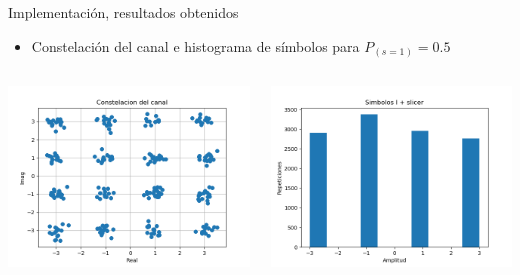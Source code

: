 \documentclass[xcolor=table]{beamer}
\begin{document}
\begin{frame}{Implementación, resultados obtenidos}
     \begin{itemize}
        \item Constelación del canal e histograma de símbolos para $P_{(s=1)}=0.5$
    \end{itemize}
\begin{columns}
    \begin{column}{0.48\paperwidth}
    \includegraphics[width=\textwidth]{Graficos/Channel_Constelation_2.png}%
    \end{column}
    \begin{column}{0.48\paperwidth}  
    \includegraphics[width=\textwidth]{Graficos/I_symbols_slicer_2.png}
    \end{column}
\end{columns}
\end{frame}
\end{document}
